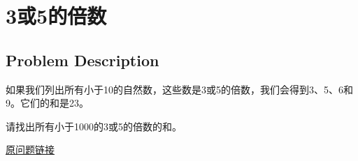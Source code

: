 \section{3或5的倍数}
\subsection{Problem Description}
\begin{tcolorbox}
如果我们列出所有小于10的自然数，这些数是3或5的倍数，我们会得到3、5、6和9。它们的和是23。

请找出所有小于1000的3或5的倍数的和。

\href{https://projecteuler.net/problem=1}{原问题链接}
\end{tcolorbox}
